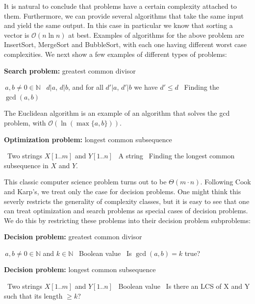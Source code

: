 \documentclass{amsart}
\theoremstyle{plain}
\numberwithin{equation}{section}
\newcommand{\bigo}{\mathcal{O}}
\begin{document}
It is natural to conclude that problems have a certain complexity attached to them. Furthermore, we
can provide several algorithms that take the same input and yield the same output. In this case in
particular we know that sorting a vector is $\bigo(n\ln n)$ at best. Examples of algorithms for the
above problem are InsertSort, MergeSort and BubbleSort, with each one having different worst case
complexities. We next show a few examples of different types of problems:

\begin{algorithm}[h]
  \caption*{\textbf{Search problem:} greatest common divisor}
  \begin{algorithmic}[1]
    \Require\,$a, b\neq 0\in\mathbb{N}$
    \Ensure\, $d|a$, $d|b$, and for all $d'|a$, $d'|b$ we have $d'\leq d$
    \Statex\, Finding the $\gcd(a, b)$
  \end{algorithmic}
\end{algorithm}

The Euclidean algorithm is an example of an algorithm that solves the gcd problem, with
$\bigo(\ln(\max\{a,b\}))$.

\begin{algorithm}[h]
  \caption*{\textbf{Optimization problem:} longest common subsequence}
  \begin{algorithmic}[1]
    \Require\, Two strings $X[1..m]$ and $Y[1..n]$
    \Ensure\, A string
    \Statex\, Finding the longest common subsequence in $X$ and $Y$.
  \end{algorithmic}
\end{algorithm}

This classic computer science problem turns out to be $\Theta(m\cdot n)$. Following Cook and
Karp's, we treat only the case for decision problems. One might think this severly restricts the
generality of complexity classes, but it is easy to see that one can treat optimization and search
problems as special cases of decision problems. We do this by restricting these problems into their
decision problem subproblems:

\begin{algorithm}[h]
  \caption*{\textbf{Decision problem:} greatest common divisor}
  \begin{algorithmic}[1]
    \Require\,$a, b\neq 0\in\mathbb{N}$ and $k\in\mathbb{N}$
    \Ensure\, Boolean value
    \Statex\, Is $\gcd(a, b)=k$ true?
  \end{algorithmic}
\end{algorithm}

\begin{algorithm}[h]
  \caption*{\textbf{Decision problem:} longest common subsequence}
  \begin{algorithmic}[1]
    \Require\, Two strings $X[1..m]$ and $Y[1..n]$
    \Ensure\, Boolean value
    \Statex\, Is there an LCS of X and Y such that its length $\geq k$?
  \end{algorithmic}
\end{algorithm}
\end{document}
